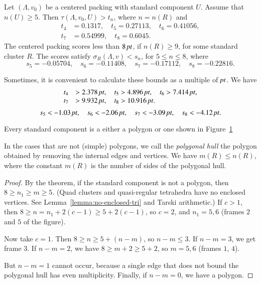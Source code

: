 \begin{theorem}
    \label{thm:the-main-theorem}
    Let $(\Lambda,v_0)$ be a centered packing  with
standard component $U$.  Assume that $n(U)\ge 5$.
Then
$\tau(\Lambda,v_0,U) > t_n$, where $n=n(R)$ and
    $$
    \begin{array}{lll}
    t_4&=0.1317,\quad t_5=0.27113,\quad
    t_6=0.41056,\\
    t_7&=0.54999,\quad t_8=0.6045.
    \end{array}
    $$
The centered packing scores less than $8\,\hbox{\it pt}$, if $n(R)\ge 9$,
for some standard cluster $R$. The scores satisfy
$\sigma_R(\Lambda,v)<s_n$, for $5\le n\le 8$, where
    $$
    s_5=-0.05704,\quad s_6=-0.11408,\quad
    s_7=-0.17112,\quad s_8=-0.22816.
    $$
\end{theorem}

Sometimes, it is convenient to calculate these bounds as a multiple
of $\hbox{\it pt}$.  We have
    $$
    \begin{array}{lll}
    t_4&>2.378\,\hbox{\it pt},\quad t_5>4.896\,\hbox{\it pt},\quad
    t_6>7.414\,\hbox{\it pt},\\
    t_7&>9.932\,\hbox{\it pt},\quad
    t_8>10.916\,\hbox{\it pt}.
    \end{array}
    $$
    $$
    s_5 < -1.03\,\hbox{\it pt},\quad s_6<-2.06\,\hbox{\it pt},\quad
    s_7<-3.09\,\hbox{\it pt},\quad s_8<-4.12\,\hbox{\it pt}.
    $$




\begin{corollary}
    \label{cor:std-aggregate-list}
Every standard component is a either a polygon or one shown in
Figure~\ref{fig:std-aggregates}
\end{corollary}



\begin{figure}[htb]
  \centering
  \caption{}
  \label{fig:std-aggregates}
\end{figure}


In the cases that are not (simple) polygons, we call the {\it polygonal
hull\/} the polygon obtained by removing the internal edges and
vertices. We have $m(R)\le n(R)$, where the constant $m(R)$ is the
number of sides of the polygonal hull.

\begin{proof}
By the theorem, if the standard component is not a polygon, then $8\ge
n_1\ge m\ge 5$. (Quad clusters and quasi-regular tetrahedra have no
enclosed vertices. See Lemma~\ref{lemma:no-enclosed-tri} and
Tarski arithmetic.) If $c>1$, then $8\ge
n=n_1+2(c-1)\ge 5+2(c-1)$, so $c=2$, and $n_1=5,6$ (frames $2$ and $5$
of the figure).

Now take $c=1$.    Then $8\ge n\ge 5+(n-m)$, so $n-m\le 3$.  If $n-m=3$,
we get frame $3$. If $n-m=2$, we have $8\ge m+2\ge 5+2$, so $m=5,6$
(frames $1$, $4$).

But $n-m=1$ cannot occur, because a single edge that does not bound the
polygonal hull has even multiplicity.  Finally, if $n-m=0$, we have a
polygon.
\end{proof}

